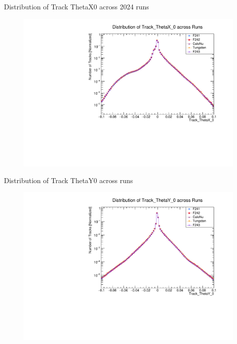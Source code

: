 \begin{frame}{Distribution of Track ThetaX0 across 2024 runs}
	\begin{figure}
		\includegraphics[width=\linewidth]{./RunwisePlots/Track_ThetaX_0_runwise.pdf}
	\end{figure}
\end{frame}
\begin{frame}{Distribution of Track ThetaY0 across runs}
	\begin{figure}
		\includegraphics[width=\linewidth]{./RunwisePlots/Track_ThetaY_0_runwise.pdf}
	\end{figure}
\end{frame}

